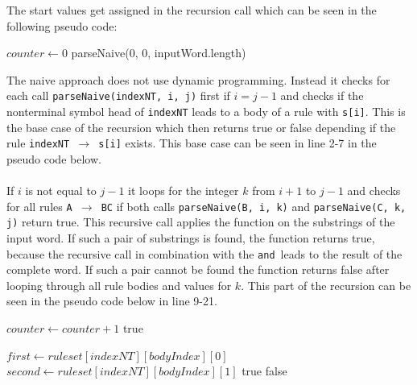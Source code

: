 \documentclass[a4paper, 11pt]{article}
\begin{document}
The start values get assigned in the recursion call which can be seen in the following pseudo code:
 
\begin{center}
\label{alg:cap}
\label{alg_naive_rec_call}
\begin{algorithmic}[1]
\State $counter \gets 0$
\State \Return parseNaive(0, 0, inputWord.length)
\end{algorithmic}
\hrulefill
\end{center}

The naive approach does not use dynamic programming. Instead it checks for each call \texttt{parseNaive(indexNT, i, j)} first if $i = j-1$ and checks if the nonterminal symbol head of \texttt{indexNT} leads to a body of a rule with \texttt{s[i]}. This is the base case of the recursion which then returns true or false depending if the rule \texttt{indexNT $\rightarrow$  s[i]} exists. This base case can be seen in line 2-7 in the pseudo code below.
\\ 
\\
If $i$ is not equal to $j-1$ it loops for the integer $k$ from $i+1$ to $j-1$ and checks for all rules \texttt{A $\rightarrow$ BC} if both calls \texttt{parseNaive(B, i, k)} and \texttt{parseNaive(C, k, j)} return true. This recursive call applies the function on the substrings of the input word. If such a pair of substrings is found, the function returns true, because the recursive call in combination with the \grqq \texttt{and}\grqq \ leads to the result of the complete word. If such a pair cannot be found the function returns false after looping through all rule bodies and values for $k$. This part of the recursion can be seen in the pseudo code below in line 9-21.





\begin{center}
\label{alg:cap}
\begin{algorithmic}[1]
\State $counter \gets counter+1$
\State \Return true
\EndIf
\EndFor

\Else
{}
\State $first \gets ruleset[indexNT][bodyIndex][0]$
\State $second \gets ruleset[indexNT][bodyIndex][1]$
\State \Return true
\EndIf
\EndFor
\EndIf
\EndFor
\EndIf
\State \Return false
\end{algorithmic}
\hrulefill
\end{center}
\end{document}
